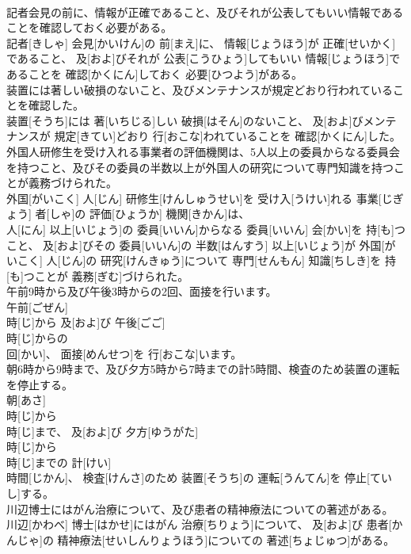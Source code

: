 \documentclass[8pt]{extreport}
\begin{document}
\begin{CJK}{UTF8}{min}
\\	記者会見の前に、情報が正確であること、及びそれが公表してもいい情報であることを確認しておく必要がある。	
\\	記者[きしゃ] 会見[かいけん]の 前[まえ]に、 情報[じょうほう]が 正確[せいかく]であること、 及[およ]びそれが 公表[こうひょう]してもいい 情報[じょうほう]であることを 確認[かくにん]しておく 必要[ひつよう]がある。
\\	装置には著しい破損のないこと、及びメンテナンスが規定どおり行われていることを確認した。	
\\	装置[そうち]には 著[いちじる]しい 破損[はそん]のないこと、 及[およ]びメンテナンスが 規定[きてい]どおり 行[おこな]われていることを 確認[かくにん]した。
\\	外国人研修生を受け入れる事業者の評価機関は、5人以上の委員からなる委員会を持つこと、及びその委員の半数以上が外国人の研究について専門知識を持つことが義務づけられた。	
\\	外国[がいこく] 人[じん] 研修生[けんしゅうせい]を 受け入[うけい]れる 事業[じぎょう] 者[しゃ]の 評価[ひょうか] 機関[きかん]は、 
\\	人[にん] 以上[いじょう]の 委員[いいん]からなる 委員[いいん] 会[かい]を 持[も]つこと、 及[およ]びその 委員[いいん]の 半数[はんすう] 以上[いじょう]が 外国[がいこく] 人[じん]の 研究[けんきゅう]について 専門[せんもん] 知識[ちしき]を 持[も]つことが 義務[ぎむ]づけられた。
\\	午前9時から及び午後3時からの2回、面接を行います。	
\\	午前[ごぜん] 
\\	時[じ]から 及[およ]び 午後[ごご] 
\\	時[じ]からの 
\\	回[かい]、 面接[めんせつ]を 行[おこな]います。
\\	朝6時から9時まで、及び夕方5時から7時までの計5時間、検査のため装置の運転を停止する。	
\\	朝[あさ] 
\\	時[じ]から 
\\	時[じ]まで、 及[およ]び 夕方[ゆうがた] 
\\	時[じ]から 
\\	時[じ]までの 計[けい] 
\\	時間[じかん]、 検査[けんさ]のため 装置[そうち]の 運転[うんてん]を 停止[ていし]する。
\\	川辺博士にはがん治療について、及び患者の精神療法についての著述がある。	
\\	川辺[かわべ] 博士[はかせ]にはがん 治療[ちりょう]について、 及[およ]び 患者[かんじゃ]の 精神療法[せいしんりょうほう]についての 著述[ちょじゅつ]がある。

\end{CJK}
\end{document}
